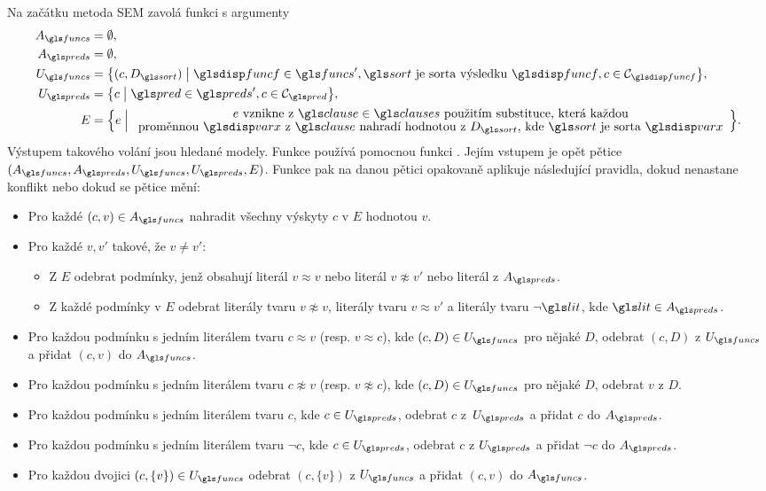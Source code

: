 Na začátku metoda SEM zavolá funkci  s argumenty
\begin{align*}
A_\funcs &= \emptyset, \\
A_\preds &= \emptyset, \\
U_\funcs &=
  \bigl\{ (c, D_\sort) \bigm|
    \func \in \funcs',
    \sort \text{ je sorta výsledku } \func,
    c \in \cells_\func \bigr\}, \\
U_\preds &=
  \bigl\{ c \bigm|
    \pred \in \preds',
    c \in \cells_\pred \bigr\}, \\
E &=
  \Bigl\{ e \Bigm|
    \array{c}
        e \text{ vznikne z $\clause \in \clauses$ použitím substituce,
                která každou} \\[-0.3ex]
      \text{proměnnou $\var$ z $\clause$ nahradí hodnotou z $D_\sort$, kde $\sort$
            je sorta $\var$}
    \endarray
    \Bigr\}.
\end{align*}
Výstupem takového volání jsou hledané modely.
Funkce  používá pomocnou funkci .
Jejím vstupem je opět pětice
$(A_\funcs, A_\preds, U_\funcs, U_\preds, E)$.
Funkce  pak na danou pětici opakovaně
aplikuje ná\-sle\-du\-jící pravidla, dokud nenastane konflikt nebo
dokud se pětice mění:
\begin{itemize}
\item Pro každé $(c, v) \in A_\funcs$ nahradit všechny výskyty $c$ v $E$
  hodnotou $v$.
\item Pro každé $v, v'$ takové, že $v \neq v'$:
  \begin{itemize}
  \item Z $E$ odebrat podmínky, jenž obsahují literál $v \approx v$
    nebo literál $v \not\approx v'$ nebo literál z $A_\preds$.
  \item Z každé podmínky v $E$ odebrat literály tvaru $v \not\approx v$,
    literály tvaru $v \approx v'$ a literály tvaru $\neg \lit$,
    kde $\lit \in A_\preds$.
  \end{itemize}
\item Pro každou podmínku s jedním literálem tvaru $c \approx v$
  (resp. $v \approx c$),
  kde $(c, D) \in U_\funcs$ pro nějaké $D$,
  odebrat $(c, D)$ z $U_\funcs$
  a přidat $(c, v)$ do $A_\funcs$.
\item Pro každou podmínku s jedním literálem tvaru $c \not\approx v$
  (resp. $v \not\approx c$),
  kde $(c, D) \in U_\funcs$ pro nějaké $D$,
  odebrat $v$ z $D$.
\item Pro každou podmínku s jedním literálem tvaru $c$,
  kde $c \in U_\preds$,
  odebrat $c$ z~$U_\preds$
  a přidat $c$ do $A_\preds$.
\item Pro každou podmínku s jedním literálem tvaru $\neg c$,
  kde $c \in U_\preds$,
  odebrat $c$ z $U_\preds$
  a přidat $\neg c$ do $A_\preds$.
\item Pro každou dvojici $(c, \{ v \}) \in U_\funcs$
  odebrat $(c, \{ v \})$ z $U_\funcs$
  a přidat $(c, v)$ do $A_\funcs$.
\end{itemize}

